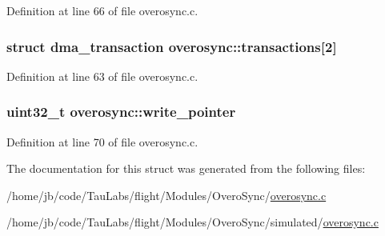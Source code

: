 \-Definition at line 66 of file overosync.\-c.

\hypertarget{structoverosync_afb53dc0407f8d5e956d83e78c3b15782}{
\subsubsection[{transactions}]{\setlength{\rightskip}{0pt plus 5cm}struct {\bf dma\-\_\-transaction} {\bf overosync\-::transactions}\mbox{[}2\mbox{]}}}\label{structoverosync_afb53dc0407f8d5e956d83e78c3b15782}


\-Definition at line 63 of file overosync.\-c.

\hypertarget{structoverosync_a094836cef0f9cc8e8b45f8d6a58dc9ad}{
\subsubsection[{write\-\_\-pointer}]{\setlength{\rightskip}{0pt plus 5cm}uint32\-\_\-t {\bf overosync\-::write\-\_\-pointer}}}\label{structoverosync_a094836cef0f9cc8e8b45f8d6a58dc9ad}


\-Definition at line 70 of file overosync.\-c.



\-The documentation for this struct was generated from the following files\-:\begin{DoxyCompactItemize}
\item 
/home/jb/code/\-Tau\-Labs/flight/\-Modules/\-Overo\-Sync/\hyperlink{overosync_8c}{overosync.\-c}\item 
/home/jb/code/\-Tau\-Labs/flight/\-Modules/\-Overo\-Sync/simulated/\hyperlink{simulated_2overosync_8c}{overosync.\-c}\end{DoxyCompactItemize}
